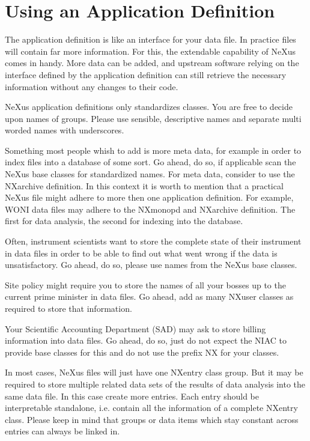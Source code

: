 \documentclass[a4paper]{article}\usepackage[dvips]{graphicx}
\begin{document}
\section{Using an Application Definition }

The application definition is like an interface for your data file. In practice files will contain 
far more information. For this, the extendable capability of NeXus comes in handy. More data can be added, 
and upstream software relying on the interface defined by the application definition can still retrieve the 
necessary information  without any changes to their code.


NeXus application definitions only standardizes classes. You are free to decide upon names of groups. Please 
use sensible, descriptive names and separate multi worded names with underscores. 



Something most people whish to add is more meta data, for example in order to index files into a database 
of some sort. Go ahead, do so, if applicable scan the NeXus base classes for standardized names. For meta data, 
consider to use the NXarchive definition. In this context it is worth to mention that a practical NeXus file might 
adhere to more then one application definition. For example, WONI data files may adhere to the NXmonopd and NXarchive 
definition. The first for data analysis, the second for indexing into the database. 


Often, instrument scientists want to store the complete state of their instrument in data files in order to be able 
to find out what went wrong if the data is unsatisfactory. Go ahead, do so, please use names from the 
NeXus base classes.


Site policy might require you to store the names of all your bosses up to the current prime minister in 
data files. Go ahead, add as many NXuser classes as required to store that information. 


Your Scientific Accounting Department (SAD) may ask to store billing information into data files. Go ahead, 
do so, just do not expect the NIAC to provide base classes for this and do not use the prefix NX for 
your classes. 


In most cases, NeXus files will just have one NXentry class group. But it may be required to store multiple related data 
sets of the results of data analysis into the same data file. In this case create more entries. Each entry should be 
interpretable standalone, i.e. contain all the information of a complete NXentry class. Please keep in mind that groups 
or data items which stay constant across entries can always be linked in.  
\end{document}

